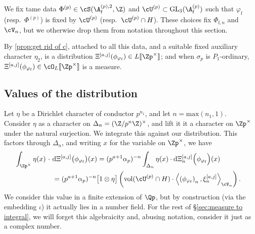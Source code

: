 \documentclass[10pt,reqno,a4paper]{amsart}
\newcommand{\subf}{_{\mathrm{f}}}
\newcommand{\GL}{\mathrm{GL}}
\begin{document}
We fix tame data $\Phi^{(p)} \in \cS(\A\subf^{(p),2},\Z)$ and $\cU^{(p)} \subset \GL_3(\A\subf^{(p)})$ such that $\varphi\subf$ (resp.\ $\Phi^{(p)}$) is fixed by $\cU^{(p)}$ (resp.\ $\cU^{(p)}\cap H$). These choices fix $\Phi_{\mathrm{f},n}$ and $\cV_n$, but we otherwise drop them from notation throughout this section.

By \cref{prop:get rid of c}, attached to all this data, and a suitable fixed auxiliary character $\eta_2$, is a distribution $\Xi^{[a,j]}(\phi_{\varphi\subf}) \in L[\![\Zp^\times]\!]$; and when $\sigma_p$ is $P_1$-ordinary, $\Xi^{[a,j]}(\phi_{\varphi\subf}) \in \cO_L[\![\Zp^\times]\!]$ is a measure.



\subsection{Values of the distribution}\label{sec:first values}
Let $\eta$ be a Dirichlet character of conductor $p^{n_1}$, and let $n = \mathrm{max}(n_1,1)$. Consider $\eta$ as a character on $\Delta_n = (\Z/p^n\Z)^\times$, and lift it it a character on $\Zp^\times$ under the natural surjection. We integrate this against our distribution. This factors through $\Delta_n$, and writing $x$ for the variable on $\Zp^\times$, we have
\begin{align}\label{eq:measure 1}
\int_{\Zp^\times} \eta(x) \  \cdot \ &\mathrm{d}\Xi^{[a,j]}\big(\phi_{\varphi\subf}\big)(x) = 	(p^{a+1}\alpha_p)^{-n} \int_{\Delta_n} \eta(x)  \cdot \mathrm{d}\Xi_n^{[a,j]}\Big(\phi_{\varphi\subf}\Big)(x)\notag\\
&= (p^{a+1}\alpha_p)^{-n}\big[1 \otimes \eta\big] \left( \operatorname{vol}(\cU^{(p)} \cap H) \cdot \left\langle \left(\phi_{\varphi\subf}\right)_n,  \xi_{n}^{[a, j]} \right\rangle_{\cV_n}\right).
\end{align}
We consider this value in a finite extension of $\Qp$, but by construction (via the embedding $\iota$) it actually lies in a number field. For the rest of \S\ref{sec:measure to integral}, we will forget this algebraicity and, abusing notation, consider it just as a complex number.
\end{document}
